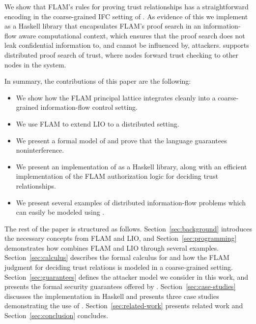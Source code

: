 We show that FLAM's rules for proving trust relationships has a straightforward encoding in the coarse-grained IFC setting of \lang. As evidence of this we implement \lang{} as a Haskell library that encapsulates FLAM's proof search in an information-flow aware computational context, which ensures that the proof search does not leak confidential information to, and cannot be influenced by, attackers. \lang{} supports distributed proof search of trust, where nodes forward trust checking to other nodes in the system.



In summary, the contributions of this paper are the following:
\begin{itemize}
    \item We show how the FLAM principal lattice integrates cleanly into a coarse-grained information-flow control setting.
    \item We use FLAM to extend LIO to a distributed setting.
    \item We present a formal model of \lang{} and prove that the language guarantees noninterference.
    \item We present an implementation of \lang{} as a Haskell library, along with an efficient implementation of the FLAM authorization logic for deciding trust relationships.
    \item We present several examples of distributed information-flow problems which can easily be modeled using \lang.
\end{itemize}

The rest of the paper is structured as follows. Section~\ref{sec:background} introduces the necessary concepts from FLAM and LIO, and Section~\ref{sec:programming} demonstrates how \lang{} combines FLAM and LIO through several examples. Section~\ref{sec:calculus} describes the formal calculus for \lang{} and how the FLAM judgment for deciding trust relations is modeled in a coarse-grained setting. Section~\ref{sec:guarantees} defines the attacker model we consider in this work, and presents the formal security guarantees offered by \lang. Section~\ref{sec:case-studies} discusses the implementation in Haskell and presents three case studies demonstrating the use of \lang. Section~\ref{sec:related-work} presents related work and Section~\ref{sec:conclusion} concludes.
